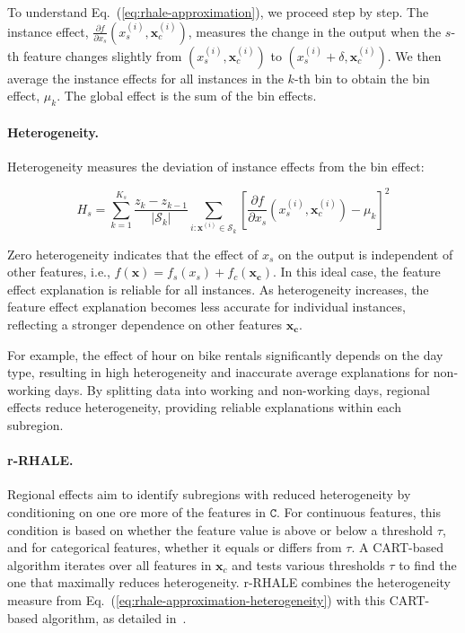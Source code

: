 \documentclass[
twocolumn,
]{ceurart}
\newcommand{\xb}{\mathbf{x}}
\newcommand{\xc}{\mathbf{x_c}}
\newcommand{\xci}{\mathbf{x}^{(i)}_c}
\begin{document}
To understand Eq.~(\ref{eq:rhale-approximation}), we proceed step by step. The instance effect, $\frac{\partial f}{\partial x_s} (x_s^{(i)}, \xci)$, measures the change in the output when the $s$-th feature changes slightly from $(x_s^{(i)}, \xci)$ to $(x_s^{(i)} + \delta, \xci)$. We then average the instance effects for all instances in the $k$-th bin to obtain the bin effect, $\mu_k$. The global effect is the sum of the bin effects.

\paragraph{Heterogeneity.}

Heterogeneity measures the deviation of instance effects from the bin effect:

\begin{equation}
  \label{eq:rhale-approximation-heterogeneity}
  H_s = \sum_{k=1}^{K_s} \frac{z_k - z_{k-1}}{|\mathcal{S}_k|}\sum_{i: \xb^{(i)} \in \mathcal{S}_k} \left [ \frac{\partial f}{\partial x_s} (x_s^{(i)}, \xci) - \mu_k \right ]^2
\end{equation}

\noindent
Zero heterogeneity indicates that the effect of $x_s$ on the output is independent of other features, i.e., \( f(\xb) = f_s(x_s) + f_c(\xc) \). In this ideal case, the feature effect explanation is reliable for all instances. As heterogeneity increases, the feature effect explanation becomes less accurate for individual instances, reflecting a stronger dependence on other features $\xc$. 

For example, the effect of hour on bike rentals significantly depends on the day type, resulting in high heterogeneity and inaccurate average explanations for non-working days. By splitting data into working and non-working days, regional effects reduce heterogeneity, providing reliable explanations within each subregion.

\paragraph{r-RHALE.}

Regional effects aim to identify subregions with reduced heterogeneity by conditioning on one ore more of the features in \( \mathtt{C} \). For continuous features, this condition is based on whether the feature value is above or below a threshold \( \tau \), and for categorical features, whether it equals or differs from \( \tau \). A CART-based algorithm iterates over all features in \( \xb_c \) and tests various thresholds \( \tau \) to find the one that maximally reduces heterogeneity.
r-RHALE combines the heterogeneity measure from Eq.~(\ref{eq:rhale-approximation-heterogeneity}) with this CART-based algorithm, as detailed in~\cite{herbinger2023decomposing, gkolemis2024effector}.
\end{document}
